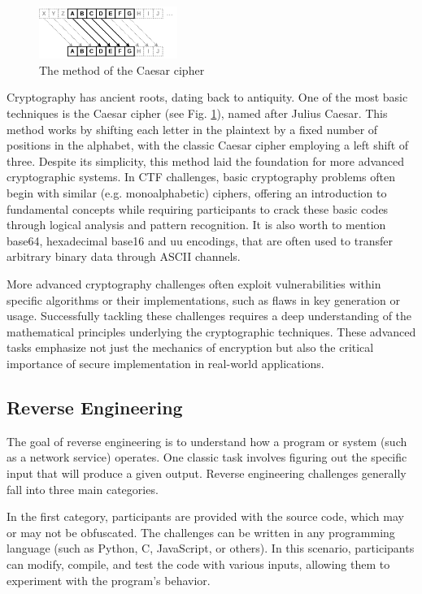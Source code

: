 \documentclass[conference]{IEEEtran}
\begin{document}
\begin{figure}[htbp]
	\centering
	\includegraphics[width=0.4\textwidth]{fig/caesar.png}
	\caption{The method of the Caesar cipher}
	\label{fig-caesar}
\end{figure}

Cryptography has ancient roots, dating back to antiquity. One of the most basic
techniques is the Caesar cipher (see Fig. \ref{fig-caesar}),
named after Julius Caesar. This method works
by shifting each letter in the plaintext by a fixed number of positions in the
alphabet, with the classic Caesar cipher employing a left shift of three.
Despite its simplicity, this method laid the foundation for more advanced
cryptographic systems. In CTF challenges, basic cryptography problems often
begin with similar (e.g. monoalphabetic) ciphers, offering an introduction
to fundamental concepts
while requiring participants to crack these basic codes through logical
analysis and pattern recognition.
It is also worth to mention base64, hexadecimal base16 and uu encodings,
that are often used to transfer arbitrary binary data through ASCII channels.

More advanced cryptography challenges often exploit vulnerabilities within
specific algorithms or their implementations, such as flaws in key generation
or usage. Successfully tackling these challenges requires a deep understanding
of the mathematical principles underlying the cryptographic techniques.
These
advanced tasks emphasize not just the mechanics of encryption but also the
critical importance of secure implementation in real-world applications.

\subsection{Reverse Engineering}

The goal of reverse engineering is to understand how a program or system (such
as a network service) operates. One classic task involves figuring out the
specific input that will produce a given output. Reverse engineering challenges
generally fall into three main categories.

In the first category, participants are provided with the source code, which
may or may not be obfuscated. The challenges can be written in any programming
language (such as Python, C, JavaScript, or others). In this scenario,
participants can modify, compile, and test the code with various inputs,
allowing them to experiment with the program’s behavior.
\end{document}
